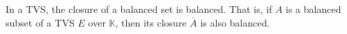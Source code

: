 In a TVS, the closure of a balanced set is balanced. That is, if $A$ is a balanced subset of a TVS $E$ over $\mathbb{K}$, then its closure $\overline{A}$ is also balanced.
